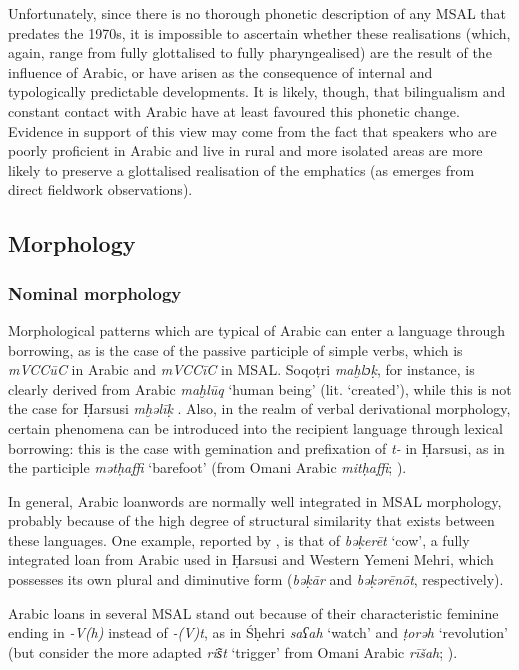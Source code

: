 \documentclass[output=paper]{langsci/langscibook}
\begin{document}
Unfortunately, since there is no thorough phonetic description of any MSAL that predates the 1970s, it is impossible to ascertain whether these realisations (which, again, range from fully glottalised to fully pharyngealised) are the result of the influence of Arabic, or have arisen as the consequence of internal and typologically predictable developments. It is likely, though, that bilingualism and constant contact with Arabic have at least favoured this phonetic change. Evidence in support of this view may come from the fact that speakers who are poorly proficient in Arabic and live in rural and more isolated areas are more likely to preserve a glottalised realisation of the emphatics (as emerges from direct fieldwork observations).


 
 \subsection{Morphology} 
 \subsubsection{Nominal morphology}\label{sec:key:nomorph}

Morphological patterns which are typical of Arabic can enter a language through borrowing, as is the case of the passive participle of simple verbs, which is \textit{mVCCūC} in Arabic and \textit{mVCCīC} in MSAL. Soqoṭri \textit{maḫlɔḳ}, for instance, is clearly derived from Arabic \textit{maḫlūq} ‘human being’ (lit. ‘created’), while this is not the case for Ḥarsusi \textit{mḫəlīḳ} \citep[299]{Lonnet2011}. Also, in the realm of verbal derivational morphology, certain phenomena can be introduced into the recipient language through lexical borrowing: this is the case with gemination and prefixation of \textit{t-} in Ḥarsusi, as in the participle \textit{mətḥaffi} ‘barefoot’ (from Omani Arabic \textit{mitḥaffi}; \citealt{Lonnet2011}).

In general, Arabic loanwords are normally well integrated in MSAL morphology, probably because of the high degree of structural similarity that exists between these languages. One example, reported by \citet{Lonnet2011}, is that of \textit{bəḳerēt} ‘cow’, a fully integrated loan from Arabic used in Ḥarsusi and Western Yemeni Mehri, which possesses its own plural and diminutive form (\textit{bəḳār} and \textit{bəḳərēnōt}, respectively).

Arabic loans in several MSAL stand out because of their characteristic feminine ending in \textit{-V(h)} instead of \textit{-(V)t}, as in Śḥehri \textit{saʕah} ‘watch’ and \textit{ṭorəh} ‘revolution’ (but consider the more adapted \textit{ris͂t} ‘trigger’ from Omani Arabic \textit{rīšah}; \citealt{Lonnet2011}). 
\end{document}

